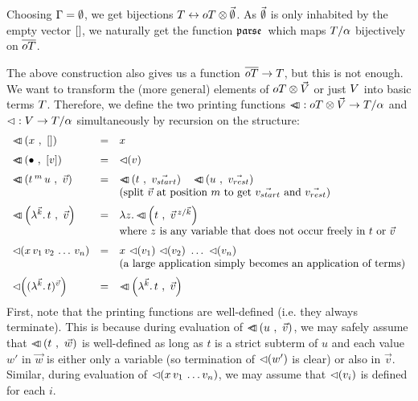 \documentclass[submission,copyright,creativecommons]{eptcs}
\begin{document}
Choosing $\Gamma = \emptyset$, we get bijections $T \leftrightarrow oT \otimes {\vec {\emptyset}}$. As $\vec {\emptyset}$ is only inhabited by the empty vector $[]$, we naturally get the 
function ${\mathfrak {parse } \,}$ which maps $T / \alpha$ bijectively on $\overline{oT}$.



The above construction also gives us a function $\overline{oT} \rightarrow T$, but this is not enough. We want to transform the (more general) elements of $oT \otimes \vec {V}$ or just $V$ into basic terms $T$.
Therefore, we
define the two printing functions ${\lhd \hspace{-6pt} \lhd} : oT \otimes \vec {V} \rightarrow T / \alpha$ and ${\mathord{\lhd}} : V \rightarrow T / \alpha$ simultaneously by recursion on the structure:
\[
\begin{array}{lcl}
\medskip
\pr{x}{\emptyVec} & = & x \\
\medskip
\pr{\ovar}{[v]} & = & \prVal v \\
\pr{t \oapp m u}{\vec v} & = & \ApA {\pr {t}{\vec{v_{start}}}  }  {\quad \pr {u}{\vec{v_{rest}}}} \\
\medskip
&& \mbox{(split $\vec v$ at position $m$ to get $\vec{v_{start}}$ and $\vec{v_{rest}}$)} \\
\pr{\LaO {\vec k} t}{\vec v} & = & \LaA z {\pr {t} {  \multiinsert{\vec v}{\vec k}{z}   }}   \\
\medskip
&& \mbox{where $z$ is any variable that does not occur freely in $t$ or $\vec v$ } \\
\prVal{x \sspace v_1 \sspace v_2 \sspace \ldots \sspace v_n} & = & x \ \prVal{v_1} \ \prVal{v_2} \ \ldots \ \prVal{v_n} \\
\medskip && \mbox{(a large application simply becomes an application of terms)} \\
\prVal{\Val {\vec k} t {\vec v}} & = & \pr{\LaO {\vec k} t}{\vec v} \\
\end{array}
\]
First, note that the printing functions are well-defined (i.e. they always terminate). This is because during evaluation of ${ {\lhd \hspace{-6pt} \lhd} \left( u \ , \ \vec v \right)}$, we may safely assume that ${ {\lhd \hspace{-6pt} \lhd} \left( t \ , \ \vec w \right)}$ is well-defined as long as $t$ is a strict subterm of $u$ and each value $w'$ in $\vec w$ is either only a variable (so termination of ${\lhd \hspace{-2pt} \left( w' \right)}$ is clear) or also in $\vec v$. Similar, during evaluation of ${\lhd \hspace{-2pt} \left( x \, v_1 \, \ldots v_n \right)}$, we may assume that ${\lhd \hspace{-2pt} \left( v_i \right)}$ is defined for each $i$.
\end{document}
